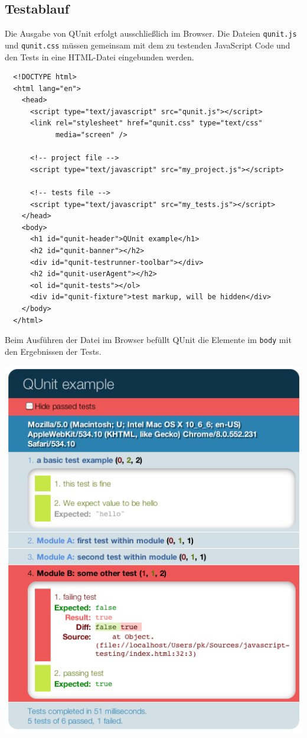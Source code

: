 \documentclass[11pt, a4paper]{article}
\begin{document}
\subsection{Testablauf}

Die Ausgabe von QUnit erfolgt ausschließlich im Browser. Die Dateien
\texttt{qunit.js} und \texttt{qunit.css} müssen gemeinsam mit dem zu testenden
JavaScript Code und den Tests in eine HTML-Datei eingebunden werden.

\begin{verbatim}
  <!DOCTYPE html>
  <html lang="en">
    <head>
      <script type="text/javascript" src="qunit.js"></script>
      <link rel="stylesheet" href="qunit.css" type="text/css"
            media="screen" />

      <!-- project file -->
      <script type="text/javascript" src="my_project.js"></script>

      <!-- tests file -->
      <script type="text/javascript" src="my_tests.js"></script>
    </head>
    <body>
      <h1 id="qunit-header">QUnit example</h1>
      <h2 id="qunit-banner"></h2>
      <div id="qunit-testrunner-toolbar"></div>
      <h2 id="qunit-userAgent"></h2>
      <ol id="qunit-tests"></ol>
      <div id="qunit-fixture">test markup, will be hidden</div>
    </body>
  </html>
\end{verbatim}

Beim Ausführen der Datei im Browser befüllt QUnit die Elemente im
\texttt{body} mit den Ergebnissen der Tests.

\begin{center}
  \includegraphics[width = 1\textwidth]{QUnit.png}
\end{center}
\end{document}
